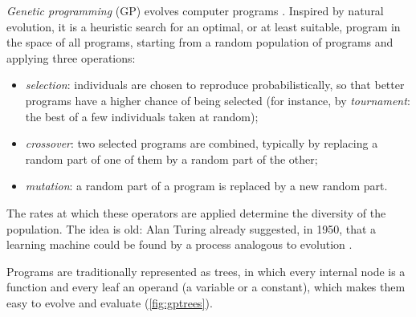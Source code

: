 \emph{Genetic programming} (GP) evolves computer programs \citep{koza1992genetic,poli2008field}. Inspired
by natural evolution, it is a heuristic search for an optimal, or at least suitable, program in the
space of all programs, starting from a random population of programs and applying three operations:
\begin{itemize}
  \item \emph{selection}: individuals are chosen to reproduce probabilistically, so that better programs
        have a higher chance of being selected (for instance, by \emph{tournament}: the best of a few
        individuals taken at random);
  \item \emph{crossover}: two selected programs are combined, typically by replacing a random part of
        one of them by a random part of the other;
  \item \emph{mutation}: a random part of a program is replaced by a new random part.
\end{itemize}
The rates at which these operators are applied determine the diversity of the population. The idea is
old: Alan Turing already suggested, in 1950, that a learning machine could be found by a process
analogous to evolution \citep{turing1950computing}.

Programs are traditionally represented as trees, in which every internal node is a function and every
leaf an operand (a variable or a constant), which makes them easy to evolve and evaluate
(\cref{fig:gptrees}).


